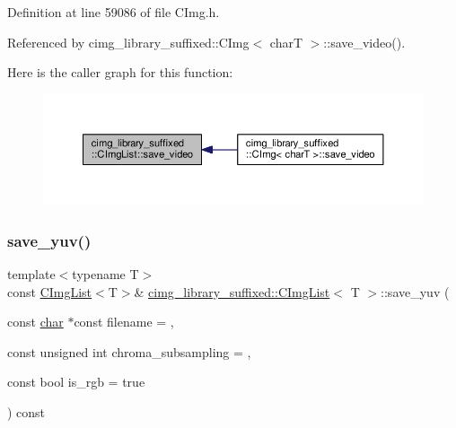 Definition at line 59086 of file C\+Img.\+h.



Referenced by cimg\+\_\+library\+\_\+suffixed\+::\+C\+Img$<$ char\+T $>$\+::save\+\_\+video().

Here is the caller graph for this function\+:
\nopagebreak
\begin{figure}[H]
\begin{center}
\leavevmode
\includegraphics[width=350pt]{d5/d7e/structcimg__library__suffixed_1_1CImgList_a4fcada66102d9f9245f11d2127dbe8fb_icgraph}
\end{center}
\end{figure}
\mbox{\label{structcimg__library__suffixed_1_1CImgList_a814df0230a293dc13c775ff885e7bfb2}} 
\subsubsection{\texorpdfstring{save\+\_\+yuv()}{save\_yuv()}\hspace{0.1cm}{\footnotesize\ttfamily [1/2]}}
{\footnotesize\ttfamily template$<$typename T$>$ \\
const \hyperlink{structcimg__library__suffixed_1_1CImgList}{C\+Img\+List}$<$T$>$\& \hyperlink{structcimg__library__suffixed_1_1CImgList}{cimg\+\_\+library\+\_\+suffixed\+::\+C\+Img\+List}$<$ T $>$\+::save\+\_\+yuv (\begin{DoxyParamCaption}\item[{const \hyperlink{classchar}{char} $\ast$const}]{filename = {},  }\item[{const unsigned int}]{chroma\+\_\+subsampling = {},  }\item[{const bool}]{is\+\_\+rgb = {\ttfamily true} }\end{DoxyParamCaption}) const\hspace{0.3cm}{\ttfamily [inline]}}



